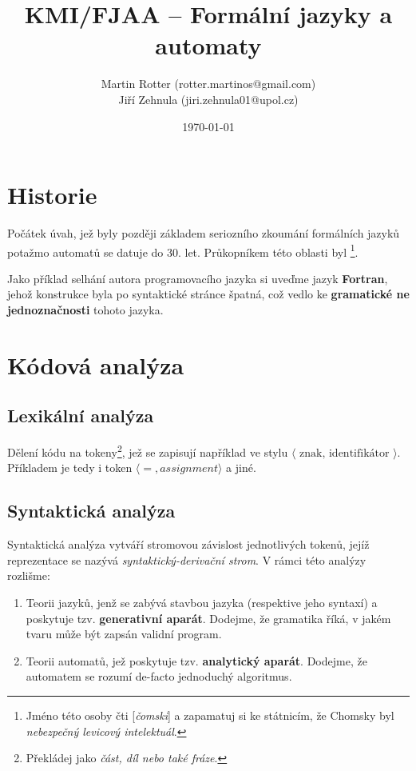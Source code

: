 \documentclass[10pt, a4paper, titlepage]{article}
\title{KMI/FJAA  -- Formální jazyky a automaty}
\author{Martin Rotter (rotter.martinos@gmail.com) \\
	Jiří Zehnula (jiri.zehnula01@upol.cz)}
\date{\today}
\theoremstyle{note}
\begin{document}
\maketitle

\section{Historie}
Počátek úvah, jež byly později základem seriozního zkoumání formálních jazyků potažmo automatů se datuje do 30. let.
Průkopníkem této oblasti byl 
\footnote{Jméno této osoby čti [\emph{čomski}] a zapamatuj si ke státnicím, že Chomsky byl \emph{nebezpečný levicový intelektuál}.}.

Jako příklad selhání autora programovacího jazyka si uveďme jazyk \textbf{Fortran}, jehož konstrukce byla po syntaktické stránce špatná,
což vedlo ke \textbf{gramatické ne jednoznačnosti} tohoto jazyka.

\section{Kódová analýza}
\subsection{Lexikální analýza}
Dělení kódu na tokeny\footnote{Překládej jako \emph{část, díl nebo také fráze}.}, jež se zapisují například ve stylu
$\langle\text{ znak, identifikátor }\rangle$.
Příkladem je tedy i token $\langle =, assignment \rangle$ a jiné.

\subsection{Syntaktická analýza}
Syntaktická analýza vytváří stromovou závislost jednotlivých tokenů, jejíž reprezentace se nazývá \emph{syntaktický-derivační strom}.
V rámci této analýzy rozlišme:
\begin{enumerate}
\item
Teorii jazyků, jenž se zabývá stavbou jazyka (respektive jeho syntaxí) a poskytuje tzv. \textbf{generativní aparát}.
Dodejme, že gramatika říká, v jakém tvaru může být zapsán validní program.

\item
Teorii automatů, jež poskytuje tzv. \textbf{analytický aparát}.
Dodejme, že automatem se rozumí de-facto jednoduchý algoritmus.
\end{enumerate}
\end{document}
